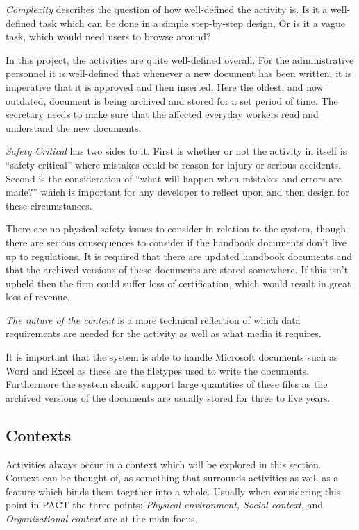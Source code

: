 
\textit{Complexity} describes the question of how well-defined the activity is.
Is it a well-defined task which can be done in a simple step-by-step design,
Or is it a vague task, which would need users to browse around? \citep{Benyon}

In this project, the activities are quite well-defined overall.
For the administrative personnel it is well-defined that whenever a new document has been written, it is imperative that it is approved and then inserted.
Here the oldest, and now outdated, document is being archived and stored for a set period of time.
The secretary needs to make sure that the affected everyday workers read and understand the new documents.


\textit{Safety Critical} has two sides to it.
First is whether or not the activity in itself is ``safety-critical'' where mistakes could be reason for injury or serious accidents.
Second is the consideration of ``what will happen when mistakes and errors are made?'' which is important for any developer to reflect upon and then design for these circumstances.
\citep{Benyon}

There are no physical safety issues to consider in relation to the system, though there are serious consequences to consider if the handbook documents don't live up to regulations.
It is required that there are updated handbook documents and that the archived versions of these documents are stored somewhere.
If this isn't upheld then the firm could suffer loss of certification, which would result in great loss of revenue.

\textit{The nature of the content} is a more technical reflection of which data requirements are needed for the activity as well as what media it requires.
\citep{Benyon}

It is important that the system is able to handle Microsoft documents such as Word and Excel as these are the filetypes used to write the documents.
Furthermore the system should support large quantities of these files as the archived versions of the documents are usually stored for three to five years.

\subsection{Contexts}
Activities always occur in a context which will be explored in this section.
Context can be thought of, as something that surrounds activities as well as a feature which binds them together into a whole.
Usually when considering this point in PACT the three points: \textit{Physical environment, Social context}, and \textit{Organizational context} are at the main focus.
\citep{Benyon}

